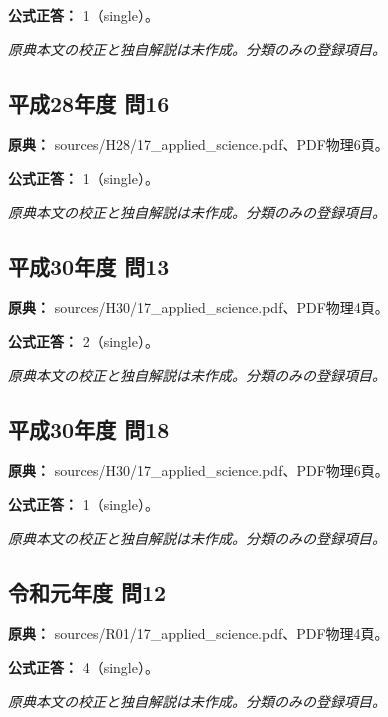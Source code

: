 \textbf{公式正答：} 1（single）。

\par\textit{原典本文の校正と独自解説は未作成。分類のみの登録項目。}

\subsection{平成28年度 問16}
\label{q:h28-reg-applied-16}

\noindent\textbf{原典：} sources/H28/17\_applied\_science.pdf、PDF物理6頁。

\textbf{公式正答：} 1（single）。

\par\textit{原典本文の校正と独自解説は未作成。分類のみの登録項目。}

\subsection{平成30年度 問13}
\label{q:h30-reg-applied-13}

\noindent\textbf{原典：} sources/H30/17\_applied\_science.pdf、PDF物理4頁。

\textbf{公式正答：} 2（single）。

\par\textit{原典本文の校正と独自解説は未作成。分類のみの登録項目。}

\subsection{平成30年度 問18}
\label{q:h30-reg-applied-18}

\noindent\textbf{原典：} sources/H30/17\_applied\_science.pdf、PDF物理6頁。

\textbf{公式正答：} 1（single）。

\par\textit{原典本文の校正と独自解説は未作成。分類のみの登録項目。}

\subsection{令和元年度 問12}
\label{q:r01-reg-applied-12}

\noindent\textbf{原典：} sources/R01/17\_applied\_science.pdf、PDF物理4頁。

\textbf{公式正答：} 4（single）。

\par\textit{原典本文の校正と独自解説は未作成。分類のみの登録項目。}

